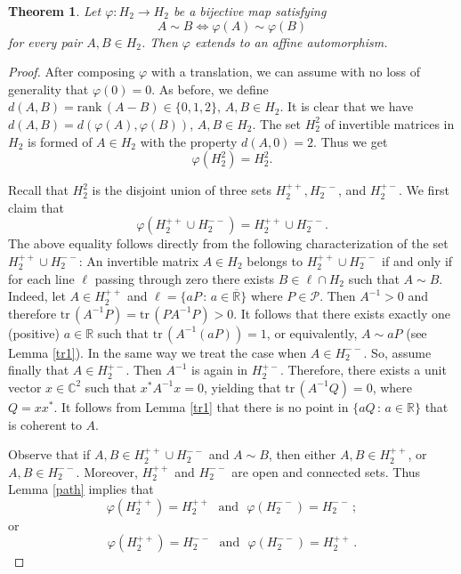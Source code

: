 \documentclass[10pt,a4paper]{amsart}
\newcommand\oR{{\overline{\mathbb{R}}}}
\newtheorem{theorem}{Theorem}[section]
\theoremstyle{definition}
\theoremstyle{remark}
\numberwithin{subsection}{section}
\numberwithin{equation}{section}
\begin{document}
\begin{theorem}\label{ftcgelem}
Let $\varphi \colon H_2 \to H_2$ be a bijective map satisfying 
\[
A \sim B \iff \varphi (A) \sim \varphi (B)
\]
for every pair $A,B \in H_2$. Then $\varphi$ extends to an affine automorphism. 
\end{theorem}

\begin{proof}
After composing $\varphi$ with a translation, we can assume with no loss of generality that $\varphi (0) =0$. 
As before, we define $d(A,B) = \mathrm{rank}\, (A-B) \in \{ 0,1,2 \}$, $A,B \in H_2$. It is clear that we have $d(A,B) = d( \varphi (A) , \varphi (B))$, $A, B \in H_2$. 
The set $H_2^2$ of invertible matrices in $H_2$ is formed of $A\in H_2$ with the property $d(A,0) = 2$. Thus we get 
\[
\varphi(H_2^2)=H_2^2.
\] 

Recall that $H_2^2$ is the disjoint union of three sets $H_2^{++}, H_2^{--}$, and $H_2^{+-}$.
We first claim that 
\[
\varphi ( H_{2}^{++} \cup H_{2}^{--} ) = H_{2}^{++} \cup H_{2}^{--} .
\]
The above equality follows directly from the following characterization of the set $H_{2}^{++} \cup H_{2}^{--}$: An invertible matrix $A \in H_2$ belongs to $H_{2}^{++} \cup H_{2}^{--}$ if and only if for each line $\ell$ passing through zero there exists $B \in \ell\cap H_2$ such that $A \sim B$. 
Indeed, let $A \in H_{2}^{++}$ and $\ell = \{ aP \, : \, a \in {\oR}\}$ where $P \in \mathcal{P}$. Then $A^{-1} > 0$ and therefore $\mathrm{tr}\, (A^{-1}P) = \mathrm{tr}\, (P A^{-1}P) >0$. It follows that there exists exactly one (positive) $a \in \mathbb{R}$ such that $\mathrm{tr}\, (A^{-1}(aP)) = 1$, or equivalently, $A \sim aP$ (see Lemma \ref{tr1}).
In the same way we treat the case when $A \in H_{2}^{--}$. So, assume finally that $A \in H_{2}^{+-}$. Then $A^{-1}$ is again in $H_{2}^{+-}$. 
Therefore, there exists a unit vector $x \in \mathbb{C}^2$ such that $x^ \ast A^{-1}x = 0$, yielding that $\mathrm{tr}\, (A^{-1}Q) = 0$, where $Q = xx^\ast$. 
It follows from Lemma \ref{tr1} that there is no point in $\{ aQ \, : \, a \in \mathbb{R} \}$ that is coherent to $A$.

Observe that if $A,B \in H_{2}^{++} \cup H_{2}^{--}$ and $A \sim B$, then either $A,B \in H_{2}^{++}$, or $A,B \in H_{2}^{--}$. 
Moreover, $H_2^{++}$ and $H_2^{--}$ are open and connected sets. 
Thus Lemma \ref{path} implies that
\[
\varphi ( H_{2}^{++} ) = H_{2}^{++}  \ \ \ \text{and} \ \ \  \varphi ( H_{2}^{--} ) = H_{2}^{--} \, ;
\]
or 
\[
\varphi ( H_{2}^{++} ) = H_{2}^{--}  \ \ \ \text{and} \ \ \  \varphi ( H_{2}^{--} ) = H_{2}^{++} \, .
\]


\end{proof}
\end{document}
